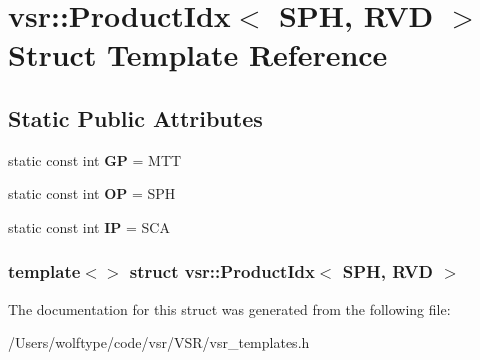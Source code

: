 \hypertarget{structvsr_1_1_product_idx_3_01_s_p_h_00_01_r_v_d_01_4}{\section{vsr\-:\-:Product\-Idx$<$ S\-P\-H, R\-V\-D $>$ Struct Template Reference}
\label{structvsr_1_1_product_idx_3_01_s_p_h_00_01_r_v_d_01_4}
}
\subsection*{Static Public Attributes}
\begin{DoxyCompactItemize}
\item 
\hypertarget{structvsr_1_1_product_idx_3_01_s_p_h_00_01_r_v_d_01_4_a93d0141c482a637905407d31790bcb9c}{static const int {\bfseries G\-P} = M\-T\-T}\label{structvsr_1_1_product_idx_3_01_s_p_h_00_01_r_v_d_01_4_a93d0141c482a637905407d31790bcb9c}

\item 
\hypertarget{structvsr_1_1_product_idx_3_01_s_p_h_00_01_r_v_d_01_4_ad40093d3da7a1f4d2db3ff40708e0b7d}{static const int {\bfseries O\-P} = S\-P\-H}\label{structvsr_1_1_product_idx_3_01_s_p_h_00_01_r_v_d_01_4_ad40093d3da7a1f4d2db3ff40708e0b7d}

\item 
\hypertarget{structvsr_1_1_product_idx_3_01_s_p_h_00_01_r_v_d_01_4_ad2ef7be3071ac89166e4f732395202b6}{static const int {\bfseries I\-P} = S\-C\-A}\label{structvsr_1_1_product_idx_3_01_s_p_h_00_01_r_v_d_01_4_ad2ef7be3071ac89166e4f732395202b6}

\end{DoxyCompactItemize}
\subsubsection*{template$<$$>$ struct vsr\-::\-Product\-Idx$<$ S\-P\-H, R\-V\-D $>$}



The documentation for this struct was generated from the following file\-:\begin{DoxyCompactItemize}
\item 
/\-Users/wolftype/code/vsr/\-V\-S\-R/vsr\-\_\-templates.\-h\end{DoxyCompactItemize}
